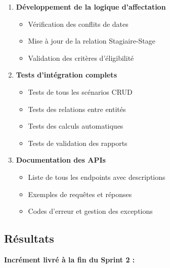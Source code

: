 \documentclass[12pt,a4paper]{report}
\begin{document}
\begin{enumerate}[leftmargin=1cm]
    \item \textbf{Développement de la logique d'affectation}
    \begin{itemize}
        \item Vérification des conflits de dates
        \item Mise à jour de la relation Stagiaire-Stage
        \item Validation des critères d'éligibilité
    \end{itemize}
    
    \item \textbf{Tests d'intégration complets}
    \begin{itemize}
        \item Tests de tous les scénarios CRUD
        \item Tests des relations entre entités
        \item Tests des calculs automatiques
        \item Tests de validation des rapports
    \end{itemize}
    
    \item \textbf{Documentation des APIs}
    \begin{itemize}
        \item Liste de tous les endpoints avec descriptions
        \item Exemples de requêtes et réponses
        \item Codes d'erreur et gestion des exceptions
    \end{itemize}
\end{enumerate}

\subsection{Résultats}

\textbf{Incrément livré à la fin du Sprint 2 :}
\end{document}
